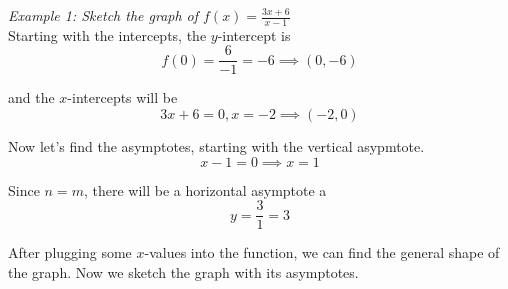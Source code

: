     \noindent \color{blue} \textit{Example 1: Sketch the graph of $f(x)=\frac{3x+6}{x-1}$}
    \color{black} \\
    Starting with the intercepts, the $y$-intercept is \\

    \begin{equation*}
        f(0)=\frac{6}{-1}=-6\implies (0, -6)
    \end{equation*}

    \noindent and the $x$-intercepts will be \\

    \begin{equation*}
        3x+6=0, x=-2\implies (-2,0)
    \end{equation*}

    \noindent Now let's find the asymptotes, starting with the vertical asypmtote. \\

    \begin{equation*}
        x-1=0\implies x=1
    \end{equation*}

    \noindent Since $n=m$, there will be a horizontal asymptote a \\

    \begin{equation*}
        y=\frac{3}{1}=3
    \end{equation*}

    \noindent After plugging some $x$-values into the function, we can find the general shape of the graph.
    Now we sketch the graph with its asymptotes. \\

    \begin{center}
    \end{center}